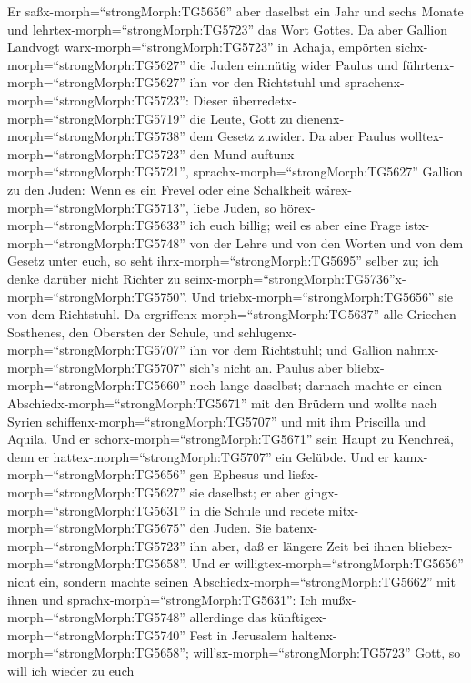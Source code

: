  Er saßx-morph=``strongMorph:TG5656'' aber daselbst ein
Jahr und sechs Monate und lehrtex-morph=``strongMorph:TG5723'' das Wort
Gottes.  Da aber Gallion Landvogt
warx-morph=``strongMorph:TG5723'' in Achaja, empörten
sichx-morph=``strongMorph:TG5627'' die Juden einmütig wider Paulus und
führtenx-morph=``strongMorph:TG5627'' ihn vor den Richtstuhl
 und sprachenx-morph=``strongMorph:TG5723'': Dieser
überredetx-morph=``strongMorph:TG5719'' die Leute, Gott zu
dienenx-morph=``strongMorph:TG5738'' dem Gesetz zuwider. 
Da aber Paulus wolltex-morph=``strongMorph:TG5723'' den Mund
auftunx-morph=``strongMorph:TG5721'',
sprachx-morph=``strongMorph:TG5627'' Gallion zu den Juden: Wenn es ein
Frevel oder eine Schalkheit wärex-morph=``strongMorph:TG5713'', liebe
Juden, so hörex-morph=``strongMorph:TG5633'' ich euch billig;
 weil es aber eine Frage istx-morph=``strongMorph:TG5748''
von der Lehre und von den Worten und von dem Gesetz unter euch, so seht
ihrx-morph=``strongMorph:TG5695'' selber zu; ich denke darüber nicht
Richter zu
seinx-morph=``strongMorph:TG5736''x-morph=``strongMorph:TG5750''.
 Und triebx-morph=``strongMorph:TG5656'' sie von dem
Richtstuhl.  Da ergriffenx-morph=``strongMorph:TG5637''
alle Griechen Sosthenes, den Obersten der Schule, und
schlugenx-morph=``strongMorph:TG5707'' ihn vor dem Richtstuhl; und
Gallion nahmx-morph=``strongMorph:TG5707'' sich's nicht an.
 Paulus aber bliebx-morph=``strongMorph:TG5660'' noch lange
daselbst; darnach machte er einen Abschiedx-morph=``strongMorph:TG5671''
mit den Brüdern und wollte nach Syrien
schiffenx-morph=``strongMorph:TG5707'' und mit ihm Priscilla und Aquila.
Und er schorx-morph=``strongMorph:TG5671'' sein Haupt zu Kenchreä, denn
er hattex-morph=``strongMorph:TG5707'' ein Gelübde.  Und er
kamx-morph=``strongMorph:TG5656'' gen Ephesus und
ließx-morph=``strongMorph:TG5627'' sie daselbst; er aber
gingx-morph=``strongMorph:TG5631'' in die Schule und redete
mitx-morph=``strongMorph:TG5675'' den Juden.  Sie
batenx-morph=``strongMorph:TG5723'' ihn aber, daß er längere Zeit bei
ihnen bliebex-morph=``strongMorph:TG5658''. Und er
willigtex-morph=``strongMorph:TG5656'' nicht ein,  sondern
machte seinen Abschiedx-morph=``strongMorph:TG5662'' mit ihnen und
sprachx-morph=``strongMorph:TG5631'': Ich
mußx-morph=``strongMorph:TG5748'' allerdinge das
künftigex-morph=``strongMorph:TG5740'' Fest in Jerusalem
haltenx-morph=``strongMorph:TG5658'';
will'sx-morph=``strongMorph:TG5723'' Gott, so will ich wieder zu euch
